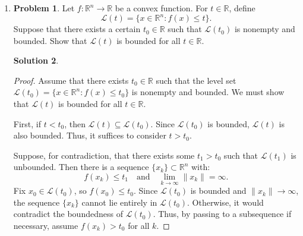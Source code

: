 \documentclass[12pt]{article}
\theoremstyle{definition}
\newtheorem*{solution}{\normalfont\textbf{Solution}}
\newtheorem*{Problem}{\noindent\textbf{Problem}}
\begin{document}
\begin{enumerate}[leftmargin=*]
\begin{solution}
\begin{proof}
            \noindent
            (d) \(\Rightarrow\) (a): Suppose \( q \) has a global minimum at some point \( x^* \). Then, by definition, \( q(x) \geq q(x^*) \) for all \( x \in \mathbb{R}^n \). Setting \( C = q(x^*) \), we have \( q(x) \geq C \) for all \( x \), so \( q \) is bounded from below.

            Since all implications (a) \(\Rightarrow\) (b), (b) \(\Rightarrow\) (c), (c) \(\Rightarrow\) (d), and (d) \(\Rightarrow\) (a) hold, the statements (a), (b), (c), and (d) are equivalent.
            \end{proof}
        \end{solution}
    
    
    \item \begin{Problem}
            Let \( f : \mathbb{R}^n \to \mathbb{R} \) be a convex function. For \( t \in \mathbb{R} \), define
            \[
            \mathcal{L}(t) = \{ x \in \mathbb{R}^n : f(x) \leq t \}.
            \]
            Suppose that there exists a certain \( t_0 \in \mathbb{R} \) such that \( \mathcal{L}(t_0) \) is nonempty and bounded. Show that \( \mathcal{L}(t) \) is bounded for all \( t \in \mathbb{R} \).
        \end{Problem}
        \begin{solution}
            \begin{proof}
                Assume that there exists \( t_0 \in \mathbb{R} \) such that the level set \( \mathcal{L}(t_0) = \{ x \in \mathbb{R}^n : f(x) \leq t_0 \} \) is nonempty and bounded. We must show that \( \mathcal{L}(t) \) is bounded for all \( t \in \mathbb{R} \).

                First, if \( t < t_0 \), then \( \mathcal{L}(t) \subseteq \mathcal{L}(t_0) \). Since \( \mathcal{L}(t_0) \) is bounded, \( \mathcal{L}(t) \) is also bounded. Thus, it suffices to consider \( t > t_0 \).

                Suppose, for contradiction, that there exists some \( t_1 > t_0 \) such that \( \mathcal{L}(t_1) \) is unbounded. Then there is a sequence \( \{x_k\} \subset \mathbb{R}^n \) with:
                \[
                f(x_k) \leq t_1 \quad \text{and} \quad \lim_{k \to \infty} \|x_k\| = \infty.
                \]
                Fix \( x_0 \in \mathcal{L}(t_0) \), so \( f(x_0) \leq t_0 \). Since \( \mathcal{L}(t_0) \) is bounded and \( \|x_k\| \to \infty \), the sequence \( \{x_k\} \) cannot lie entirely in \( \mathcal{L}(t_0) \). Otherwise, it would contradict the boundedness of \( \mathcal{L}(t_0) \). Thus, by passing to a subsequence if necessary, assume \( f(x_k) > t_0 \) for all \( k \).


\end{proof}
\end{solution}
\end{enumerate}
\end{document}
